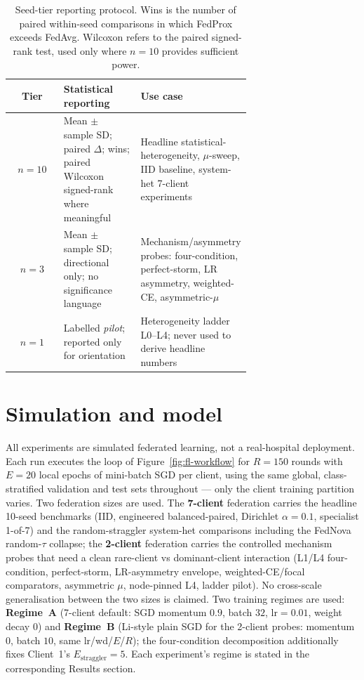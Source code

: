 \documentclass[11pt,a4paper]{report}
\begin{document}
\begin{table}[H]
\centering
\small
\caption{Seed-tier reporting protocol. Wins is the number of paired
within-seed comparisons in which FedProx exceeds FedAvg. Wilcoxon refers
to the paired signed-rank test, used only where $n = 10$ provides
sufficient power.}
\label{tab:seed-tiers}
\begin{tabular}{c p{0.32\linewidth} p{0.36\linewidth}}
\hline
Tier         & Statistical reporting                                                                            & Use case                                                                                                  \\
\hline
$n = 10$     & Mean $\pm$ sample SD; paired $\Delta$; wins; paired Wilcoxon signed-rank where meaningful        & Headline statistical-heterogeneity, $\mu$-sweep, IID baseline, system-het 7-client experiments            \\
$n = 3$      & Mean $\pm$ sample SD; directional only; no significance language                                & Mechanism/asymmetry probes: four-condition, perfect-storm, LR asymmetry, weighted-CE, asymmetric-$\mu$    \\
$n = 1$      & Labelled \emph{pilot}; reported only for orientation                                            & Heterogeneity ladder L0--L4; never used to derive headline numbers                                        \\
\hline
\end{tabular}
\end{table}

\section{Simulation and model}
\label{sec:method-simulation}

All experiments are simulated federated learning, not a real-hospital deployment.
Each run executes the loop of Figure~\ref{fig:fl-workflow} for $R = 150$ rounds
with $E = 20$ local epochs of mini-batch SGD per client, using the same global,
class-stratified validation and test sets throughout --- only the client training
partition varies. Two federation sizes are used. The \textbf{7-client} federation
carries the headline 10-seed benchmarks (IID, engineered balanced-paired,
Dirichlet $\alpha = 0.1$, specialist 1-of-7) and the random-straggler system-het
comparisons including the FedNova random-$\tau$ collapse; the \textbf{2-client}
federation carries the controlled mechanism probes that need a clean rare-client
vs dominant-client interaction (L1/L4 four-condition, perfect-storm, LR-asymmetry
envelope, weighted-CE/focal comparators, asymmetric $\mu$, node-pinned L4, ladder
pilot). No cross-scale generalisation between the two sizes is claimed. Two
training regimes are used: \textbf{Regime~A} (7-client default: SGD momentum
$0.9$, batch $32$, $\textrm{lr} = 0.01$, weight decay $0$) and \textbf{Regime~B}
(Li-style plain SGD for the 2-client probes: momentum $0$, batch $10$, same
lr/wd/$E$/$R$); the four-condition decomposition additionally fixes Client~1's
$E_{\textrm{straggler}} = 5$. Each experiment's regime is stated in the
corresponding Results section.
\end{document}
